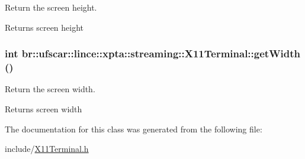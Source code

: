 Return the screen height. 

\begin{DoxyReturn}{Returns}
screen height 
\end{DoxyReturn}
\hypertarget{classbr_1_1ufscar_1_1lince_1_1xpta_1_1streaming_1_1X11Terminal_aa5fd1bf532e03b039849220fa99e1503}{
\subsubsection[{getWidth}]{\setlength{\rightskip}{0pt plus 5cm}int br::ufscar::lince::xpta::streaming::X11Terminal::getWidth ()}}
\label{classbr_1_1ufscar_1_1lince_1_1xpta_1_1streaming_1_1X11Terminal_aa5fd1bf532e03b039849220fa99e1503}


Return the screen width. 

\begin{DoxyReturn}{Returns}
screen width 
\end{DoxyReturn}


The documentation for this class was generated from the following file:\begin{DoxyCompactItemize}
\item 
include/\hyperlink{X11Terminal_8h}{X11Terminal.h}\end{DoxyCompactItemize}
